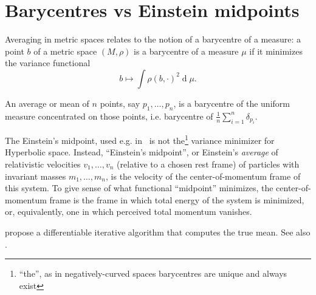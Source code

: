 \section{Barycentres vs Einstein midpoints}

Averaging in metric spaces relates to the notion of a barycentre of a measure:
a point \( b \) of a metric space \( (M, \rho) \) is a barycentre of a measure
\( \mu \) if it minimizes the variance functional
\[ b \mapsto \int \rho(b, \cdot)^2\operatorname{d}\mu. \]

An average or mean of \( n \) points, say \( p_1, \ldots, p_n \), is a
barycentre of the uniform measure concentrated on those points, i.e. barycentre
of \( \frac1n\sum_{i=1}^n \delta_{p_i} \).

The Einstein's midpoint, used e.g. in~\cite{khrulkov} is not
the\footnote{``the'', as in negatively-curved spaces barycentres are unique and
always exist}
variance minimizer for Hyperbolic space. Instead, ``Einstein's midpoint'', or
Einstein's \emph{average} of relativistic velocities \( v_1, \ldots, v_n \)
(relative to a chosen rest frame) of particles with invariant masses \( m_1,
\ldots, m_n \), is the velocity of the center-of-momentum frame of
this system. To give sense of what functional ``midpoint'' minimizes, the
center-of-momentum frame is the frame in which total energy of the system is
minimized, or, equivalently, one in which perceived total momentum vanishes.

\citet{diffThroughFrechet} propose a differentiable iterative algorithm
that computes the true mean. See also \citet{gdFrechetHyperbolic}.
